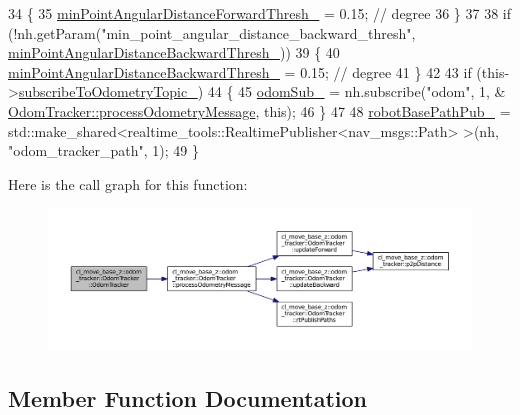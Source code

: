 \begin{DoxyCode}
34     \{
35         \hyperlink{classcl__move__base__z_1_1odom__tracker_1_1OdomTracker_a3567ebfbc56db63e0fad52e0c4936c30}{minPointAngularDistanceForwardThresh\_} = 0.15; \textcolor{comment}{// degree}
36     \}
37 
38     \textcolor{keywordflow}{if} (!nh.getParam(\textcolor{stringliteral}{"min\_point\_angular\_distance\_backward\_thresh"}, 
      \hyperlink{classcl__move__base__z_1_1odom__tracker_1_1OdomTracker_a2d166d65e97d4aa7851c45fd81985a85}{minPointAngularDistanceBackwardThresh\_}))
39     \{
40         \hyperlink{classcl__move__base__z_1_1odom__tracker_1_1OdomTracker_a2d166d65e97d4aa7851c45fd81985a85}{minPointAngularDistanceBackwardThresh\_} = 0.15; \textcolor{comment}{// degree}
41     \}
42 
43     \textcolor{keywordflow}{if} (this->\hyperlink{classcl__move__base__z_1_1odom__tracker_1_1OdomTracker_afbe614b53a1493eb8268b8ea65b5b93a}{subscribeToOdometryTopic\_})
44     \{
45         \hyperlink{classcl__move__base__z_1_1odom__tracker_1_1OdomTracker_ab55df0e91246e43dff80912dc35a4fee}{odomSub\_} = nh.subscribe(\textcolor{stringliteral}{"odom"}, 1, &
      \hyperlink{classcl__move__base__z_1_1odom__tracker_1_1OdomTracker_a12c5a839cfde2e8f2f55a5e0c9647b18}{OdomTracker::processOdometryMessage}, \textcolor{keyword}{this});
46     \}
47 
48     \hyperlink{classcl__move__base__z_1_1odom__tracker_1_1OdomTracker_a40a7cbb6bb6595e250e7c685c781613b}{robotBasePathPub\_} = std::make\_shared<realtime\_tools::RealtimePublisher<nav\_msgs::Path>
      >(nh, \textcolor{stringliteral}{"odom\_tracker\_path"}, 1);
49 \}
\end{DoxyCode}


Here is the call graph for this function\+:
\nopagebreak
\begin{figure}[H]
\begin{center}
\leavevmode
\includegraphics[width=350pt]{classcl__move__base__z_1_1odom__tracker_1_1OdomTracker_ac37583fabb6d4397318b9e19598d0118_cgraph}
\end{center}
\end{figure}




\subsection{Member Function Documentation}
